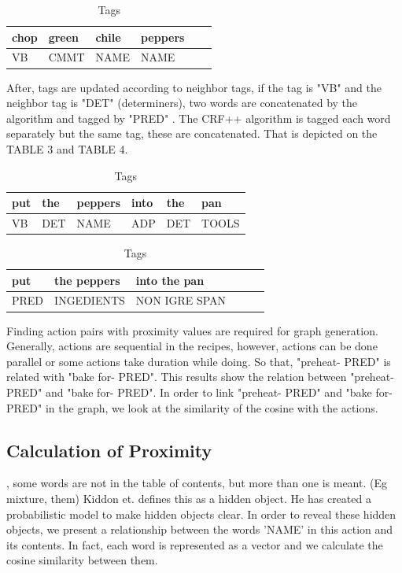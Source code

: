 \begin{table}[]
\centering
\caption{Tags}
\label{my-label}
\begin{tabular}{|l|l|l|l|l|l|}
\hline
chop & green & chile & peppers \\ \hline
VB     & CMMT    & NAME    & NAME      \\ \hline
\end{tabular}
\end{table}

 After, tags are updated according to neighbor tags, if the tag is "VB" and the neighbor tag is "DET" (determiners), two words are concatenated by the algorithm and tagged by "PRED" . The CRF++ algorithm is tagged each word separately but  the same tag,    these are concatenated. That is depicted on the TABLE 3 and TABLE 4. 
 
 \begin{table}[]
\centering
\caption{Tags}
\label{my-label}
\begin{tabular}{|l|l|l|l|l|l|}
\hline
put    & the     &  peppers  & into  & the    & pan \\ \hline
VB    & DET   & NAME     & ADP & DET & TOOLS      \\ \hline
\end{tabular}
\end{table}

 \begin{table}[]
\centering
\caption{Tags}
\label{my-label}
\begin{tabular}{|l|l|l|l|l|l|}
\hline
put       &  the peppers       & into  the pan \\ \hline
PRED  & INGEDIENTS & NON IGRE SPAN  \\ \hline
\end{tabular}
\end{table}

Finding action pairs with proximity values are required for graph generation. Generally, actions are sequential in the recipes, however, actions can be done  parallel or some actions take duration while doing. So that, "preheat- PRED" is related with "bake for- PRED". This results show the relation between "preheat- PRED" and "bake for- PRED". In order to link "preheat- PRED"  and  "bake for- PRED" in the graph,  we look at the similarity of the cosine with the actions. 




\subsection{Calculation of Proximity}
\cite{kiddon2015mise}, some words are not in the table of contents, but more than one is meant. (Eg mixture, them) Kiddon et.\cite{kiddon2015mise} defines this as a hidden object. He has created a probabilistic model to make hidden objects clear. In order to reveal these hidden objects, we present a relationship between the words 'NAME' in this action and its contents. In fact, each word is represented as a vector and we calculate the cosine similarity between them.

